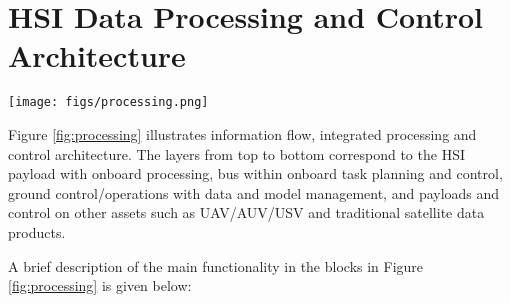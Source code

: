 \section{HSI Data Processing and Control Architecture} \label{sec:processing}
\begin{figure*}[htbp]
  \begin{center}
    \texttt{[image: figs/processing.png]}
    \caption{High-level processing and control architecture for \hypso}
    \label{fig:processing}
  \end{center}
\end{figure*}
Figure \ref{fig:processing} illustrates
information flow, integrated processing and control architecture. The
layers from top to bottom correspond to the HSI payload with
onboard processing, \hypso bus within onboard task planning and control,
ground control/operations with data and model management, and payloads
and control on other assets such as UAV/AUV/USV and traditional
satellite data products.

A brief description of the main functionality in the blocks in Figure
\ref{fig:processing} is given below:

